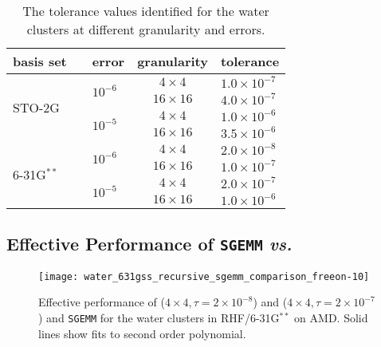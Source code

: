 \begin{table}
\caption{\label{table:tolerance_values} The tolerance values identified for the
water clusters at different \SpAMM{} granularity and errors.}
\begin{center}
\begin{tabular}{lllcl}
\hline
\hline
basis set                       & \hspace{0.2cm} & error                      & granularity    & tolerance \\
\hline
\multirow{4}{*}{STO-2G}         &                & \multirow{2}{*}{$10^{-6}$} & $4  \times  4$ & $1.0 \times 10^{-7}$ \\
                                &                &                            & $16 \times 16$ & $4.0 \times 10^{-7}$ \\
\cline{3-5}
                                &                & \multirow{2}{*}{$10^{-5}$} & $4  \times  4$ & $1.0 \times 10^{-6}$ \\
                                &                &                            & $16 \times 16$ & $3.5 \times 10^{-6}$ \\
\cline{1-5}
\multirow{4}{*}{6-31G${}^{**}$} &                & \multirow{2}{*}{$10^{-6}$} & $4  \times  4$ & $2.0 \times 10^{-8}$ \\
                                &                &                            & $16 \times 16$ & $1.0 \times 10^{-7}$ \\
\cline{3-5}
                                &                & \multirow{2}{*}{$10^{-5}$} & $4  \times  4$ & $2.0 \times 10^{-7}$ \\
                                &                &                            & $16 \times 16$ & $1.0 \times 10^{-6}$ \\
\hline
\hline
\end{tabular}
\end{center}
\end{table}

\subsection{Effective Performance of {\tt SGEMM} \emph{vs.}~\SpAMM{}}

\begin{figure}
\texttt{[image: water\_631gss\_recursive\_sgemm\_comparison\_freeon-10]}
\caption{\label{fig:water_631gss_sgemm_comparison_AMD} Effective performance of
\SpAMM{}($4 \times 4, \tau = 2 \times 10^{-8}$) and \SpAMM{}($4 \times 4, \tau
= 2 \times 10^{-7}$) and {\tt SGEMM} for the water clusters in
RHF/6-31G${}^{**}$ on AMD. Solid lines show fits to second order polynomial.}
\end{figure}

